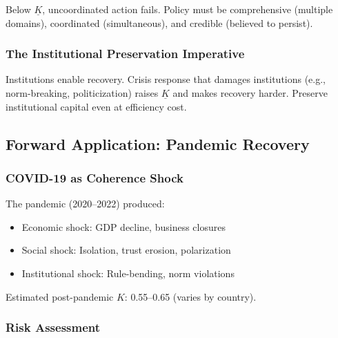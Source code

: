 \begin{tcolorbox}[colback=yellow!5!white, colframe=yellow!75!black, title=Policy Principle 3: Coordinate or Fail]
Below $\underline{K}$, uncoordinated action fails. Policy must be 
comprehensive (multiple domains), coordinated (simultaneous), and 
credible (believed to persist).
\end{tcolorbox}

\subsubsection{The Institutional Preservation Imperative}

\begin{tcolorbox}[colback=yellow!5!white, colframe=yellow!75!black, title=Policy Principle 4: Protect Institutions]
Institutions enable recovery. Crisis response that damages institutions 
(e.g., norm-breaking, politicization) raises $\underline{K}$ and makes 
recovery harder. Preserve institutional capital even at efficiency cost.
\end{tcolorbox}

\subsection{Forward Application: Pandemic Recovery}

\subsubsection{COVID-19 as Coherence Shock}

The pandemic (2020--2022) produced:
\begin{itemize}
    \item Economic shock: GDP decline, business closures
    \item Social shock: Isolation, trust erosion, polarization
    \item Institutional shock: Rule-bending, norm violations
\end{itemize}

Estimated post-pandemic $K$: 0.55--0.65 (varies by country).

\subsubsection{Risk Assessment}

